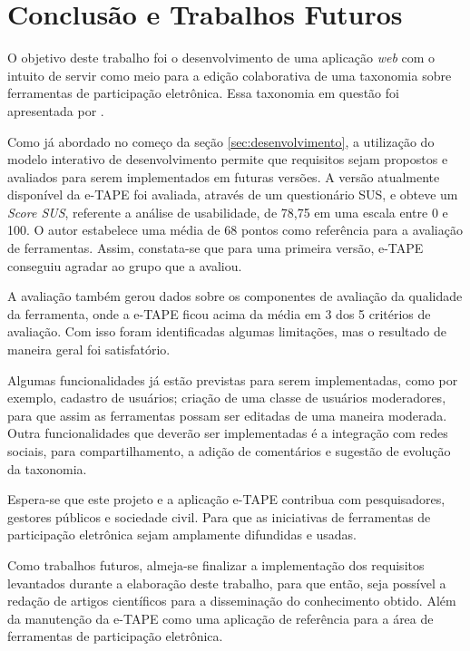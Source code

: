 \chapter[Conclusão e Trabalhos Futuros]{Conclusão e Trabalhos Futuros}
\label{cap:cap5}

O objetivo deste trabalho foi o desenvolvimento de uma aplicação \textit{web} com o intuito de servir como meio para a edição colaborativa de uma taxonomia
sobre ferramentas de participação eletrônica. Essa taxonomia em questão foi apresentada por .

\par
Como já abordado no começo da seção \ref{sec:desenvolvimento}, a utilização do modelo interativo de desenvolvimento permite que requisitos sejam propostos e avaliados para serem
implementados em futuras versões. A versão atualmente disponível da e-TAPE foi avaliada, através de um questionário SUS, e obteve um \textit{Score SUS}, referente a análise de usabilidade,
de 78,75 em uma escala entre 0 e 100. O autor  estabelece uma média de 68 pontos como referência para a avaliação de ferramentas. 
Assim, constata-se que para uma primeira versão, e-TAPE conseguiu agradar ao grupo que a avaliou. 

\par
A avaliação também gerou dados sobre os componentes de avaliação da qualidade da ferramenta, onde a e-TAPE ficou acima da média em 3 dos 5 critérios de avaliação. Com isso foram
identificadas algumas limitações, mas o resultado de maneira geral foi satisfatório. 

\par
Algumas funcionalidades já estão previstas para serem implementadas, como por exemplo, cadastro de usuários; criação de uma classe de usuários moderadores,
para que assim as ferramentas possam ser editadas de uma maneira moderada. Outra funcionalidades que deverão ser implementadas é a integração com redes sociais, para compartilhamento, 
a adição de comentários e sugestão de evolução da taxonomia.

\par
Espera-se que este projeto e a aplicação e-TAPE contribua com pesquisadores, gestores públicos e sociedade civil. Para que as iniciativas de ferramentas de participação eletrônica
sejam amplamente difundidas e usadas. 

\par
Como trabalhos futuros, almeja-se finalizar a implementação dos requisitos levantados durante a elaboração deste trabalho, para que então, seja possível a redação de artigos científicos
para a disseminação do conhecimento obtido. Além da manutenção da e-TAPE como uma aplicação de referência para a área de ferramentas de participação eletrônica.